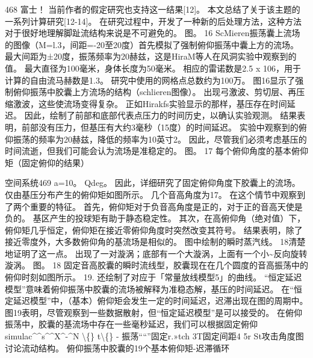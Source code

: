 \documentclass[UTF8,11pt,a4paper,openany,fontset=fandol]{ctexbook}
\begin{document}
468 富士！ 当前作者的假定研究也支持这一结果[12]。 本文总结了关于该主题的一系列计算研究[12-14]。 在研究过程中，开发了一种新的后处理方法，这种方法对于很好地理解脚趾流结构来说是不可避免的。 图。 16 ScMieren振荡囊上流场的图像（M=l.3，间距=-20至20度）首先模拟了强制俯仰振荡中囊上方的流场。 最大间距为±20度，振荡频率为20赫兹，这是HiraM等人在风洞实验中观察到的值。 最大直径为100毫米，身体长度为50毫米。 相应的雷诺数是2.5 x 106，用于计算的自由流马赫数是1.3。 研究中使用的网格点总数约为100万。 图16显示了强制俯仰振荡中胶囊上方流场的结构（schlieren图像）。 出现弓激波、剪切层、再压缩激波，这些使流场变得复杂。 正如Hirakfs实验显示的那样，基压存在时间延迟。 因此，绘制了前部和底部代表点压力的时间历史，以确认实验观测。 结果表明，前部没有压力，但基压有大约3毫秒（15度）的时间延迟。 实验中观察到的俯仰振荡的频率为20赫兹，降低的频率为10英寸2。 因此，尽管我们必须考虑基压的时间流逝，但我们可能会认为流场是准稳定的。 图。 17 每个俯仰角度的基本俯仰矩（固定俯仰的结果）

空间系统469 a=10。 Qdeg。 因此，详细研究了固定俯仰角度下胶囊上的流场。 仅由基压分布产生的俯仰矩如图所示。 几个音高角度为17。 在这个情节中观察到了两个重要的特征。 首先，俯仰矩对于负音高角度是正的，对于正的音高天使是负的。 基区产生的投球矩有助于静态稳定性。 其次，在高俯仰角（绝对值）下，俯仰矩几乎恒定，俯仰矩在接近零俯仰角度时突然改变其符号。 结果表明，除了接近零度外，大多数俯仰角的基流场是相似的。 图中绘制的瞬时蒸汽线。 18清楚地证明了这一点。 出现了一对漩涡；底部有一个大漩涡，上面有一个小\textasciitilde{}反向旋转漩涡。 图。 18 固定音高胶囊的瞬时流线型，胶囊现在在几个圆度的音高振荡中的俯仰时刻如图所示。 19. 还绘制了对应于「常量放线模型5」的曲线。 “恒定延迟模型”意味着俯仰振荡中胶囊的流场被解释为准稳态解，基压的时间延迟。 在“恒定延迟模型”中，（基本）俯仰矩会发生一定的时间延迟，迟滞出现在图的周期中。 图19表明，尽管观察到一些数据散射，但“恒定延迟模型”是可以接受的。 在俯仰振荡中，胶囊的基流场中存在一些毫秒延迟，我们可以根据固定俯仰simulac\textasciicircum{}\textasciicircum{}s\textasciicircum{}\textasciicircum{}X\textasciicircum{}-\textasciicircum{}N \textbackslash\{\} t\textbackslash\{\} - 振荡““”固定r.»tch 3T固定间距4 5r St攻击角度图讨论流动结构。 俯仰振荡中胶囊的19个基本俯仰矩-迟滞循环
\end{document}
